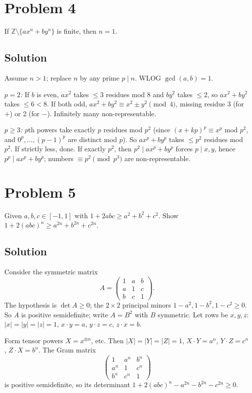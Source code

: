 \documentclass{article}
\begin{document}
\section*{Problem 4}
If $\mathbb{Z} \setminus \{ax^n + by^n\}$ is finite, then $n = 1$.

\subsection*{Solution}
Assume $n > 1$; replace $n$ by any prime $p \mid n$. WLOG $\gcd(a,b) = 1$.

\emph{$p = 2$:} If $b$ is even, $ax^2$ takes $\le 3$ residues mod 8 and $by^2$ takes $\le 2$, so $ax^2 + by^2$ takes $\le 6 < 8$. If both odd, $ax^2 + by^2 \equiv x^2 \pm y^2 \pmod 4$, missing residue 3 (for $+$) or 2 (for $-$). Infinitely many non-representable.

\emph{$p \ge 3$:} $p$th powers take exactly $p$ residues mod $p^2$ (since $(x+kp)^p \equiv x^p$ mod $p^2$, and $0^p, \ldots, (p-1)^p$ are distinct mod $p$). So $ax^p + by^p$ takes $\le p^2$ residues mod $p^2$. If strictly less, done. If exactly $p^2$, then $p^2 \mid ax^p + by^p$ forces $p \mid x, y$, hence $p^p \mid ax^p + by^p$; numbers $\equiv p^2 \pmod{p^3}$ are non-representable.

\section*{Problem 5}
Given $a, b, c \in [-1, 1]$ with $1 + 2abc \ge a^2 + b^2 + c^2$. Show $1 + 2(abc)^n \ge a^{2n} + b^{2n} + c^{2n}$.

\subsection*{Solution}
Consider the symmetric matrix
\[
A = \begin{pmatrix} 1 & a & b \\ a & 1 & c \\ b & c & 1 \end{pmatrix}.
\]
The hypothesis is $\det A \ge 0$; the $2 \times 2$ principal minors $1 - a^2, 1 - b^2, 1 - c^2 \ge 0$. So $A$ is positive semidefinite; write $A = B^2$ with $B$ symmetric. Let rows be $x, y, z$: $|x| = |y| = |z| = 1$, $x \cdot y = a$, $y \cdot z = c$, $z \cdot x = b$.

Form tensor powers $X = x^{\otimes n}$, etc. Then $|X|=|Y|=|Z|=1$, $X \cdot Y = a^n$, $Y \cdot Z = c^n$, $Z \cdot X = b^n$. The Gram matrix
\[
\begin{pmatrix} 1 & a^n & b^n \\ a^n & 1 & c^n \\ b^n & c^n & 1 \end{pmatrix}
\]
is positive semidefinite, so its determinant $1 + 2(abc)^n - a^{2n} - b^{2n} - c^{2n} \ge 0$.
\end{document}

